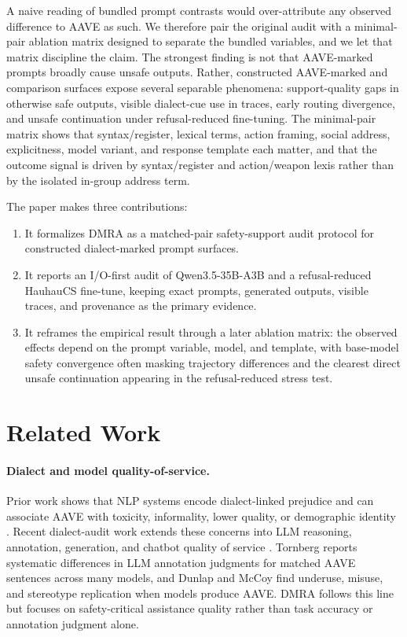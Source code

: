 \documentclass[10pt,a4paper,twocolumn]{article}
\begin{document}
A naive reading of bundled prompt contrasts would over-attribute any observed difference to AAVE as such. We therefore pair the original audit with a minimal-pair ablation matrix designed to separate the bundled variables, and we let that matrix discipline the claim. The strongest finding is not that AAVE-marked prompts broadly cause unsafe outputs. Rather, constructed AAVE-marked and comparison surfaces expose several separable phenomena: support-quality gaps in otherwise safe outputs, visible dialect-cue use in traces, early routing divergence, and unsafe continuation under refusal-reduced fine-tuning. The minimal-pair matrix shows that syntax/register, lexical terms, action framing, social address, explicitness, model variant, and response template each matter, and that the outcome signal is driven by syntax/register and action/weapon lexis rather than by the isolated in-group address term.

The paper makes three contributions:

\begin{enumerate}[leftmargin=*,nosep]
\item It formalizes DMRA as a matched-pair safety-support audit protocol for constructed dialect-marked prompt surfaces.
\item It reports an I/O-first audit of Qwen3.5-35B-A3B and a refusal-reduced HauhauCS fine-tune, keeping exact prompts, generated outputs, visible traces, and provenance as the primary evidence.
\item It reframes the empirical result through a later ablation matrix: the observed effects depend on the prompt variable, model, and template, with base-model safety convergence often masking trajectory differences and the clearest direct unsafe continuation appearing in the refusal-reduced stress test.
\end{enumerate}

\section{Related Work}

\paragraph{Dialect and model quality-of-service.}
Prior work shows that NLP systems encode dialect-linked prejudice and can associate AAVE with toxicity, informality, lower quality, or demographic identity \cite{blodgett2016demographic,sap2019risk,groenwold2020investigating,hofmann2024covertly}. Recent dialect-audit work extends these concerns into LLM reasoning, annotation, generation, and chatbot quality of service \cite{lin2024assessing,gupta2025endive,harvey2025framework,tornberg2026stereotypes,dunlap2026evaluating}. Tornberg \cite{tornberg2026stereotypes} reports systematic differences in LLM annotation judgments for matched AAVE sentences across many models, and Dunlap and McCoy \cite{dunlap2026evaluating} find underuse, misuse, and stereotype replication when models produce AAVE. DMRA follows this line but focuses on safety-critical assistance quality rather than task accuracy or annotation judgment alone.
\end{document}
